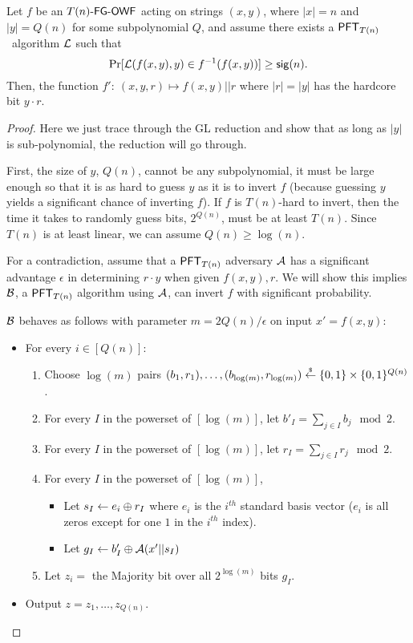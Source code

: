 \begin{theorem}\label{thm:fine-grained-GL}
	Let $f$ be an ${T(n)}\textsf{-FG-OWF}$ acting on strings $(x, y)$, where $|x| = n$ and $|y| = Q(n)$ for some subpolynomial $Q$, and assume there exists a $\mathsf{PFT}_{T(n)}$~algorithm ${\cal L}$ such that
	\[\Pr[{\cal L}(f(x,y), y) \in f^{-1}(f(x,y))] \ge \mathsf{sig}(n).\]
	Then, the function $f':~(x,y,r) \mapsto f(x,y)||r$ where $|r| = |y|$ has the hardcore bit $y \cdot r$.
\end{theorem}
\begin{proof}	
	Here we just trace through the GL reduction and show that as long as $|y|$ is sub-polynomial, the reduction will go through.
	
	First, the size of $y$, $Q(n)$, cannot be any subpolynomial, it must be large enough so that it is as hard to guess $y$ as it is to invert $f$ (because guessing $y$ yields a significant chance of inverting $f$). If $f$ is $T(n)$-hard to invert, then the time it takes to randomly guess bits, $2^{Q(n)}$, must be at least $T(n)$. Since $T(n)$ is at least linear, we can assume $Q(n) \ge \log(n)$.
	
	For a contradiction, assume that a $\mathsf{PFT}_{T(n)}$ adversary $\mathcal{A}$ has a significant advantage $\epsilon$ in determining $r \cdot y$ when given $f(x,y), r$. We will show this implies ${\cal B}$, a $\mathsf{PFT}_{T(n)}$ algorithm using $\mathcal{A}$, can invert $f$ with significant probability.
	
	${\cal B}$ behaves as follows with parameter $m = 2Q(n)/\epsilon$ on input $x' = f(x,y)$:
	\begin{itemize}
		\item For every $i \in [Q(n)]$:
		\begin{enumerate}
			\item Choose $\log(m)$ pairs $(b_1, r_1), \dots, (b_{\log(m)}, r_{\log(m)}) \stackrel{\scriptscriptstyle{\$}}{\gets} \{0,1\} \times \{0,1\}^{Q(n)}$.
			\item For every $I$ in the powerset of $[\log(m)]$, let $b'_I = \sum_{j \in I}b_j \mod 2$.
			\item For every $I$ in the powerset of $[\log(m)]$, let $r_I = \sum_{j \in I}r_j \mod 2$.
			\item For every $I$ in the powerset of $[\log(m)]$,
			\begin{itemize}
						\item Let $s_I \gets e_i \oplus r_I$ where $e_i$ is the $i^{th}$ standard basis vector ($e_i$ is all zeros except for one $1$ in the $i^{th}$ index).
						\item Let $g_I \gets b'_I \oplus \mathcal{A}(x'||s_I)$
			\end{itemize}
			\item Let $z_i = $ the Majority bit over all $2^{\log(m)}$ bits $g_I$.%
		\end{enumerate}
		\item Output $z = z_1, \dots, z_{Q(n)}$.
	\end{itemize}
	

\end{proof}

